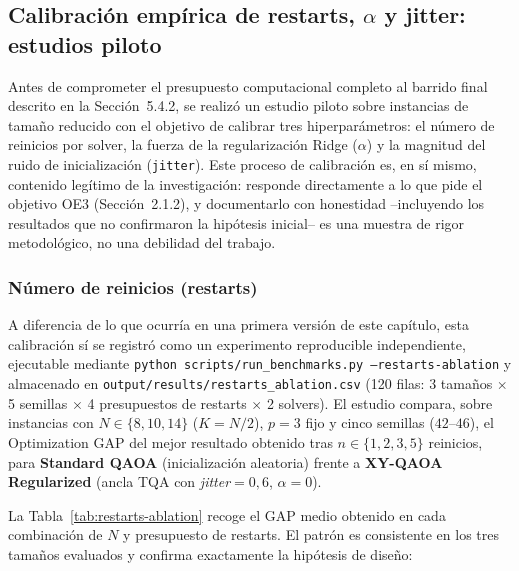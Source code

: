\subsection{Calibración empírica de restarts, $\alpha$ y jitter: estudios piloto}
\label{subsec:calibracion_empirica}

Antes de comprometer el presupuesto computacional completo al barrido final descrito en la Sección~5.4.2, se realizó un estudio piloto sobre instancias de tamaño reducido con el objetivo de calibrar tres hiperparámetros: el número de reinicios por solver, la fuerza de la regularización Ridge ($\alpha$) y la magnitud del ruido de inicialización (\texttt{jitter}). Este proceso de calibración es, en sí mismo, contenido legítimo de la investigación: responde directamente a lo que pide el objetivo OE3 (Sección~2.1.2), y documentarlo con honestidad --incluyendo los resultados que no confirmaron la hipótesis inicial-- es una muestra de rigor metodológico, no una debilidad del trabajo.

\subsubsection{Número de reinicios (restarts)}

A diferencia de lo que ocurría en una primera versión de este capítulo, esta calibración sí se registró como un experimento reproducible independiente, ejecutable mediante \texttt{python scripts/run\_benchmarks.py --restarts-ablation} y almacenado en \texttt{output/results/restarts\_ablation.csv} (120 filas: 3 tamaños $\times$ 5 semillas $\times$ 4 presupuestos de restarts $\times$ 2 solvers). El estudio compara, sobre instancias con $N \in \{8, 10, 14\}$ ($K=N/2$), $p=3$ fijo y cinco semillas ($42$--$46$), el Optimization GAP del mejor resultado obtenido tras $n \in \{1, 2, 3, 5\}$ reinicios, para \textbf{Standard QAOA} (inicialización aleatoria) frente a \textbf{XY-QAOA Regularized} (ancla TQA con \textit{jitter}$=0{,}6$, $\alpha=0$).

La Tabla~\ref{tab:restarts-ablation} recoge el GAP medio obtenido en cada combinación de $N$ y presupuesto de restarts. El patrón es consistente en los tres tamaños evaluados y confirma exactamente la hipótesis de diseño:

